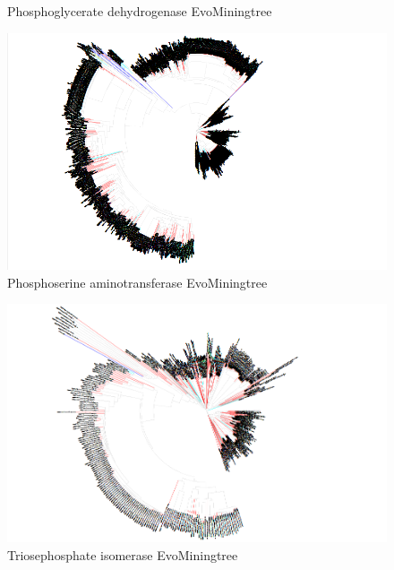 \documentclass[12pt,twoside]{reedthesis}
\begin{document}
\begin{figure}[h!tbp]
  \caption[Phosphoglycerate dehydrogenase EvoMiningtree]{\normalsize{Phosphoglycerate dehydrogenase EvoMiningtree}}
  \label{fig:Phosphoglycerate_dehydrogenase_evo_tree}
  \end{figure}\begin{figure}[h!tbp]
  \centering
  \includegraphics[angle = 180,scale = 0.25]{chapter2/Cyanobacteria/tree2.png}
  \caption[Phosphoserine aminotransferase EvoMiningtree]{\normalsize{Phosphoserine aminotransferase EvoMiningtree}}
  \label{fig:Phosphoserine_aminotransferase_evo_tree}
  \end{figure}\begin{figure}[h!tbp]
  \centering
  \includegraphics[angle = 180,scale = 0.25]{chapter2/Cyanobacteria/tree10.png}
  \caption[Triosephosphate isomerase EvoMiningtree]{\normalsize{Triosephosphate isomerase EvoMiningtree}}
  \label{fig:Triosephosphate_isomerase_evo_tree}
  \end{figure}\begin{figure}[h!tbp]

\end{figure}
\end{document}
